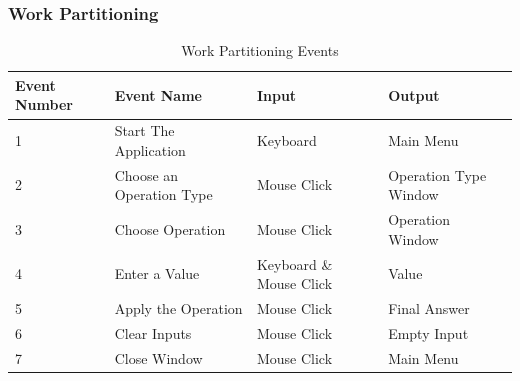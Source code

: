 \documentclass[12pt, titlepage]{article}
\begin{document}
\subsubsection{Work Partitioning}
\begin{table}[H]
\centering
\footnotesize
\begin{tabular}{@{}|l|l|l|l|@{}}
\hline
Event Number & Event Name               & Input                   & Output                \\ \hline
1            & Start The Application    & Keyboard                & Main Menu             \\ \hline
2            & Choose an Operation Type & Mouse Click             & Operation Type Window \\ \hline
3            & Choose Operation         & Mouse Click             & Operation Window      \\ \hline
4            & Enter a Value            & Keyboard \& Mouse Click & Value                 \\ \hline
5            & Apply the Operation      & Mouse Click             & Final Answer          \\ \hline
6            & Clear Inputs             & Mouse Click             & Empty Input           \\ \hline
7            & Close Window             & Mouse Click             & Main Menu             \\ \hline
\end{tabular}
\caption{Work Partitioning Events}
\end{table}
\end{document}
